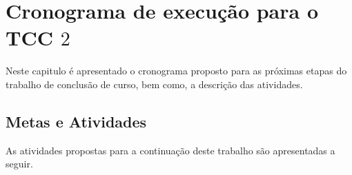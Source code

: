 		
\chapter{Cronograma de execução para o TCC $2$}
\label{chap:cronograma}


Neste capitulo é apresentado o cronograma proposto para as próximas etapas do trabalho de conclusão de curso, bem como, a descrição das atividades.

\section{Metas e Atividades}
\label{sec:ativ}

	
As atividades propostas para a continuação deste trabalho são apresentadas a seguir. 

